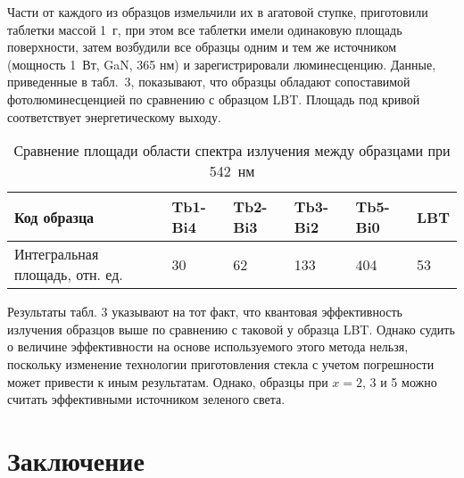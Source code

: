 \documentclass[press]{vestnik}
\begin{document}
Части от каждого из образцов измельчили их в агатовой ступке, приготовили 
таблетки массой 1~г, при этом все таблетки имели одинаковую площадь 
поверхности, затем возбудили все образцы одним и тем же источником (мощность 
1~Вт, GaN, 365 нм) и зарегистрировали люминесценцию. Данные, приведенные в 
табл.~3, показывают, что образцы обладают сопоставимой фотолюминесценцией 
по сравнению с образцом LBT. Площадь под кривой соответствует 
энергетическому выходу.

\begin{table}
\caption{Сравнение площади области спектра излучения между образцами при 
542~нм}
\begin{tabularx}{\textwidth}{|P{55mm}|Y|Y|Y|Y|Y|}
\hline
Код образца& 
Tb1-Bi4& 
Tb2-Bi3& 
Tb3-Bi2& 
Tb5-Bi0& 
LBT \\
\hline
Интегральная площадь, отн. ед.& 
30& 
62& 
133& 
404& 
53 \\
\hline
\end{tabularx}
\label{tab3}
\end{table}

Результаты табл. 3 указывают на тот факт, что квантовая эффективность 
излучения образцов выше по сравнению с таковой у образца LBT. Однако судить 
о величине эффективности на основе используемого этого метода нельзя, 
поскольку изменение технологии приготовления стекла с учетом погрешности 
может привести к иным результатам. Однако, образцы при $x = 2$, 3 и 5 можно 
считать эффективными источником зеленого света.

\section*{Заключение}
\end{document}
